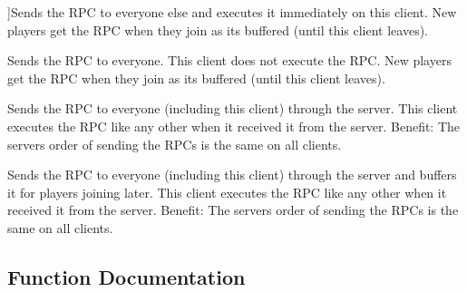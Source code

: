 \begin{Desc}
\begin{description}
{}]Sends the R\+PC to everyone else and executes it immediately on this client. New players get the R\+PC when they join as it\textquotesingle{}s buffered (until this client leaves).\item[{\em 
Others\+Buffered\hypertarget{group__public_api_ggab84b274b6aa3b3a3d7810361da16170fa7eb09c07159c5b57395510a1c3755705}{}\label{group__public_api_ggab84b274b6aa3b3a3d7810361da16170fa7eb09c07159c5b57395510a1c3755705}
}]Sends the R\+PC to everyone. This client does not execute the R\+PC. New players get the R\+PC when they join as it\textquotesingle{}s buffered (until this client leaves).\item[{\em 
All\+Via\+Server\hypertarget{group__public_api_ggab84b274b6aa3b3a3d7810361da16170fa07d978b16f68f868668a6384df9bc11b}{}\label{group__public_api_ggab84b274b6aa3b3a3d7810361da16170fa07d978b16f68f868668a6384df9bc11b}
}]Sends the R\+PC to everyone (including this client) through the server. This client executes the R\+PC like any other when it received it from the server. Benefit\+: The server\textquotesingle{}s order of sending the R\+P\+Cs is the same on all clients. \item[{\em 
All\+Buffered\+Via\+Server\hypertarget{group__public_api_ggab84b274b6aa3b3a3d7810361da16170fa2dd089935363426140d8d54fee80464c}{}\label{group__public_api_ggab84b274b6aa3b3a3d7810361da16170fa2dd089935363426140d8d54fee80464c}
}]Sends the R\+PC to everyone (including this client) through the server and buffers it for players joining later. This client executes the R\+PC like any other when it received it from the server. Benefit\+: The server\textquotesingle{}s order of sending the R\+P\+Cs is the same on all clients. \end{description}
\end{Desc}


\subsection{Function Documentation}
